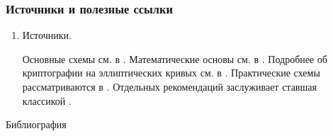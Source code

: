 
\appendix


\begin{frame}
\frametitle{Источники и полезные ссылки}
\begin{enumerate}
    \item \alert{Источники}. 
    
    Основные схемы см. в \cite{bib:chmora:crypto,bib:shangin:protect,bib:shneir:applCrypto}. Математические основы см. в \cite{bib:mao:modernCrypto,bib:smart:crypto}. Подробнее об криптографии на эллиптических кривых см. в \cite{bib:bolotov:elliptic, bib:bolotov:ellipticProtocol}. Практические схемы рассматриваются в \cite{bib:mao:modernCrypto,bib:shneir:applCrypto,bib:smart:crypto,bib:shangin:protect}. Отдельных рекомендаций заслуживает ставшая классикой \cite{bib:shneir:applCrypto}.
\end{enumerate}    
\end{frame}

\begin{frame}[allowframebreaks]{Библиография}
    
    
\end{frame}

